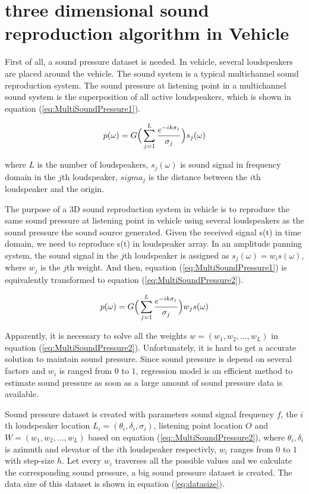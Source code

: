 \documentclass[runningheads,a4paper]{llncs}
\begin{document}
\section{three dimensional sound reproduction algorithm in Vehicle}\label{sec:algorithm}
First of all, a sound pressure dataset is needed. In vehicle, several loudspeakers are placed around the vehicle. The sound system is a typical multichannel sound reproduction system. The sound pressure at listening point in a multichannel sound system is the superposition of all active loudspeakers, which is shown in equation (\ref{eq:MultiSoundPressure1}).

\begin{equation}\label{eq:MultiSoundPressure1}
p(\omega)
=G\Big(\sum\limits^{L}_{j=1}\frac{e^{-ik\sigma_j}}{\sigma_j}\Big)s_j(\omega) \\
\end{equation}

where $L$ is the number of loudspeakers, $s_j(\omega)$ is sound signal in frequency domain in the $j$th loudspeaker, $sigma_j$ is the distance between the $i$th loudspeaker and the origin.

The purpose of a 3D sound reproduction system in vehicle is to reproduce the same sound pressure at listening point in vehicle using several loudspeakers as the sound pressure the sound source generated. Given the received signal s(t) in time domain, we need to reproduce s(t) in loudspeaker array. In an amplitude panning system, the sound signal in the $j$th loudspeaker is assigned as $ s_j(\omega)=w_is(\omega)$, where $w_j$ is the $j$th weight. And then, equation (\ref{eq:MultiSoundPressure1}) is equivalently transformed to equation (\ref{eq:MultiSoundPressure2}).

\begin{equation}\label{eq:MultiSoundPressure2}
p(\omega)
=G\Big(\sum\limits^{L}_{j=1}\frac{e^{-ik\sigma_j}}{\sigma_j}\Big)w_js(\omega) \\
\end{equation}

Apparently, it is necessary to solve all the weights $w=(w_1,w_2,\dots,w_L)$ in equation (\ref{eq:MultiSoundPressure2}).  Unfortunately, it is hard to get a accurate solution to maintain sound pressure. Since sound pressure is depend on several factors and $w_i$ is ranged from $0$ to $1$, regression model is an efficient method to estimate sound pressure as soon as a large amount of sound pressure data is available.

Sound pressure dataset is created with parameters sound signal frequency $f$, the $i$th loudspeaker location $L_i=(\theta_i,\delta_i,\sigma_i)$, listening point location $O$ and $ W=(w_1,w_2,\dots,w_L) $ based on equation (\ref{eq::MultiSoundPressure2}), where  $\theta_i,\delta_i$ is azimuth and elevator of the $i$th loudspeaker respectivly, $w_i$ ranges from $0$ to $1$ with step-size $ h $. Let every $w_i$ traverses all the possible values and we calculate the corresponding sound pressure, a big sound pressure dataset is created. The data size of this dataset is shown in equation (\ref{eq:datasize}).
\end{document}
